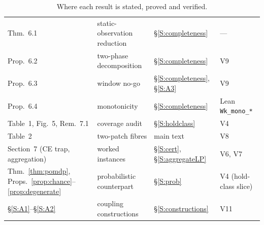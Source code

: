 \documentclass[11pt,a4paper]{article}
\theoremstyle{plain}
\theoremstyle{definition}
\theoremstyle{remark}
\begin{document}
\begin{table}[htbp]
\begin{tabularx}{\textwidth}{@{}>{\raggedright\arraybackslash}p{}>{\raggedright\arraybackslash}X>{\raggedright\arraybackslash}p{}>{\raggedright\arraybackslash}p{}@{}}
Thm.~6.1 & static-observation reduction & \S\ref{S:completeness} & ---\\
Prop.~6.2 & two-phase decomposition & \S\ref{S:completeness} & V9\\
Prop.~6.3 & window no-go & \S\ref{S:completeness}, \S\ref{S:A3} & V9\\
Prop.~6.4 & monotonicity & \S\ref{S:completeness} & Lean \texttt{Wk\_mono\_*}\\
Table~1, Fig.~5, Rem.~7.1 & coverage audit & \S\ref{S:holdclass} & V4\\
Table~2 & two-patch fibres & main text & V8\\
Section~7 (CE trap, aggregation) & worked instances & \S\ref{S:cert}, \S\ref{S:aggregateLP} & V6, V7\\
Thm.~\ref{thm:pomdp}, Props.~\ref{prop:chance}--\ref{prop:degenerate} & probabilistic counterpart & \S\ref{S:prob} & V4 (hold-class slice)\\
\S\ref{S:A1}--\S\ref{S:A2} & coupling constructions & \S\ref{S:constructions} & V11\\
\bottomrule
\end{tabularx}
\caption{Where each result is stated, proved and verified.}
\label{tab:map}
\end{table}
\end{document}
